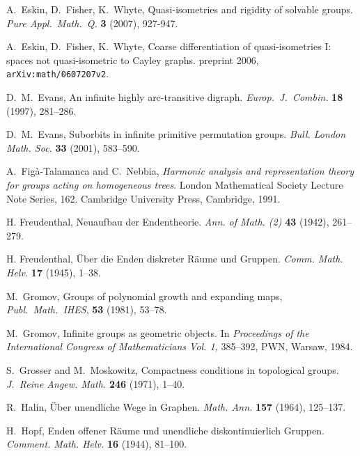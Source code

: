 \documentclass{emsprocart}
\theoremstyle{definition}
\begin{document}
\begin{thebibliography}{99}
 A.~Eskin, D.~Fisher, K.~Whyte,
                Quasi-isometries and rigidity of solvable groups.
                {\em Pure Appl.\ Math.\ Q.} {\bf 3} (2007), 927-947.

 A.~Eskin, D.~Fisher, K.~Whyte,
                Coarse differentiation of quasi-isometries I: spaces
                not quasi-isometric to Cayley graphs.
                preprint 2006, {\tt arXiv:math/0607207v2}.

   D.\ M.\ Evans, An infinite highly arc-transitive
                digraph. {\it Europ.\ J.\ Combin.} {\bf 18} (1997), 281--286.

   D.\ M.\ Evans, Suborbits in infinite primitive
                permutation groups. {\em Bull. London Math. Soc.}
                {\bf 33} (2001), 583--590.

A.~Fig{\`a}-Talamanca and
C.~Nebbia, {\em Harmonic analysis and representation theory for groups acting on homogeneous trees}.
London Mathematical Society Lecture Note Series, 162. Cambridge University Press, Cambridge, 1991.

 H. Freudenthal,
                Neuaufbau der Endentheorie.
                {\em Ann. of Math. (2)} {\bf 43} (1942), 261--279.

 H. Freudenthal,
                \"Uber die Enden diskreter R\"aume und Gruppen.
                {\em Comm. Math. Helv.} {\bf 17} (1945), 1--38.

                M.\ Gromov,
                Groups of polynomial growth and expanding maps,
                {\em Publ.\ Math.\ IHES}, {\bf 53} (1981), 53--78.

                M.\ Gromov,
                Infinite groups as geometric objects. 
                In {\em Proceedings of the International Congress of
                Mathematicians Vol. 1,}  385--392,
                PWN, Warsaw, 1984. 

  S.\ Grosser and M.\ Moskowitz,
                Compactness conditions in topological groups.
                {\em J.\ Reine Angew. Math.} {\bf 246} (1971), 1--40.

 R.~Halin,
                \"Uber unendliche Wege in Graphen.
                {\em Math. Ann.} {\bf 157} (1964), 125--137.

  H.~Hopf,
                Enden offener R\"aume und unendliche diskontinuierlich
                Gruppen.
                {\em   Comment. Math. Helv.} {\bf 16}  (1944),
                81--100.


\end{thebibliography}
\end{document}
